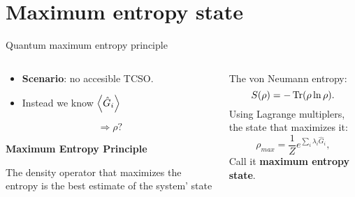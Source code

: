 \section{Maximum entropy state}

\begin{frame}{Quantum maximum entropy principle}
    \begin{columns}
        \begin{column}{0.5\textwidth}
            \begin{itemize}
                \item \textbf{Scenario}: no accesible TCSO.
                \item Instead we know $\expval{\hat{G}_{i}}$
            \end{itemize}
            \begin{equation*}
                \Longrightarrow \rho\text{?}
            \end{equation*}
            \vspace{0.1cm}

            \textbf{Maximum Entropy Principle}
            \begin{tcolorbox}
                The density operator that maximizes the entropy is the best estimate of the system' state
            \end{tcolorbox}
            \vspace{0.5cm}
        \end{column}
        \begin{column}{0.5\textwidth}
            The von Neumann entropy:
            \begin{equation*}
                S(\rho)=-\Tr(\rho\ln{\rho}).
            \end{equation*}
            Using Lagrange multiplers, the state that maximizes it:
            \begin{equation*}
                \rho_{max}=\frac{1}{Z}e^{\sum_{i}\lambda_{i}\hat{G}_{i}},
            \end{equation*}
            Call it \textbf{maximum entropy state}.
        \end{column}
    \end{columns}
\end{frame}

